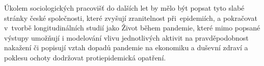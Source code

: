Úkolem sociologických pracovišť do dalších let by mělo být popsat tyto slabé stránky české společnosti, které zvyšují zranitelnost při epidemiích, a pokračovat v tvorbě longitudinálních studií jako Život během pandemie, které mimo popsané výstupy umožňují i modelování vlivu jednotlivých aktivit na pravděpodobnost nakažení či popisují vztah dopadů pandemie na ekonomiku a duševní zdraví a poklesu ochoty dodržovat protiepidemická opatření.